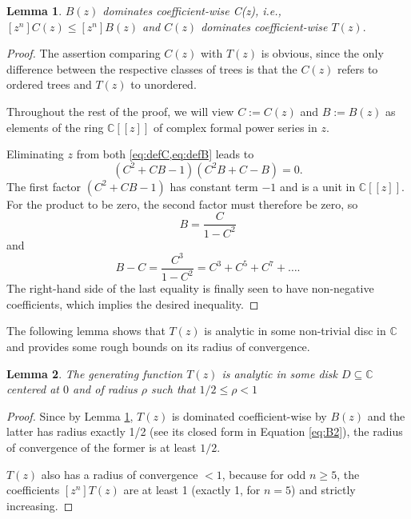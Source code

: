 \documentclass{amsart}
\theoremstyle{plain}
\newtheorem{lemma}{Lemma}
\newcommand{\nicetrees}{T}
\begin{document}
\begin{lemma}\label{lem:planeTreeCoeffIneq} $B(z)$ dominates coefficient-wise C(z), i.e.,
 $[z^n] C(z) \leq [z^n] B(z)$ and $C(z)$ dominates coefficient-wise $T(z).$
\end{lemma}
\begin{proof} The assertion comparing $C(z)$ with $T(z)$ is obvious, since the only difference between the respective classes of trees is that the $C(z)$ refers to ordered trees and $T(z)$ to unordered. 

Throughout the rest of the proof, we will  view
$C:=C(z)$ and $B:=B(z)$ as elements of the ring
$\mathbb{C}[[z]]$ of complex  formal power series in $z$.

Eliminating $z$ from both \cref{eq:defC,eq:defB} leads to
\begin{equation*}
    (C^2 + CB - 1)(C^2B + C - B) = 0.
\end{equation*}
The first factor $(C^2 + CB - 1)$ has constant term $-1$ and is a
unit in $\mathbb{C}[[z]]$. For the product to be zero,
the second factor must therefore be zero, so
\begin{equation*}
    B = \frac{C}{1-C^2}
\end{equation*}
and 
\begin{equation*}
    B - C = \frac{C^3}{1-C^2} = C^3 + C^5 + C^7 + \dots .
\end{equation*}
The right-hand side of the last equality is finally seen to have non-negative coefficients,
which implies the desired inequality. 
\end{proof}


The following lemma shows that $\nicetrees(z)$ is analytic 
in some non-trivial disc in $\mathbb{C}$ and provides
some rough  bounds on its radius of convergence. 

\begin{lemma}\label{lemma:tIsAnalyt}
The generating function $\nicetrees(z)$ is analytic
in some disk $D \subseteq \mathbb{C}$ centered at $0$ and 
of radius $\rho$ such that $1/2 \leq \rho < 1$
\end{lemma}
\begin{proof}
Since by Lemma   \ref{lem:planeTreeCoeffIneq}, $T(z)$ is dominated coefficient-wise by $B(z)$ and the latter has radius exactly 1/2 (see its closed form in Equation \eqref{eq:B2}), the radius of convergence of the former is at least $1/2$.

$\nicetrees(z)$ also has a
radius of convergence $< 1$, because for odd $n\geq 5$, the
coefficients $[z^n]\nicetrees(z)$ are at least  1 (exactly 1, for $n=5$)  and strictly increasing.

\end{proof}
\end{document}
